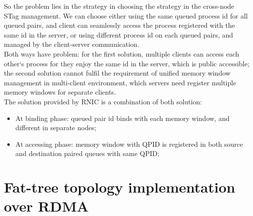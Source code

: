 \documentclass[11pt,openright,a4paper]{report}
\begin{document}
So the problem lies in the strategy in choosing the strategy in the cross-node STag management. We can choose either using the same queued process id for all queued pairs, and client can seamlessly access the process registered with the same id in the server, or using different process id on each queued pairs, and managed by the client-server communication\cite{hilland2010method}.\\
Both ways have problem: for the first solution, multiple clients can access each other`s process for they enjoy the same id in the server, which is public accessible; the second solution cannot fulfil the requirement of unified memory window management in multi-client environment, which servers need register multiple memory windows for separate clients.\\
The solution provided by RNIC is a combination of both solution:
\begin{itemize}
	\item At binding phase: queued pair id binds with each memory window, and different in separate nodes;
    \item At accessing phase: memory window with QPID is registered in both source and destination paired queues with same QPID;
\end{itemize}
\section{Fat-tree topology implementation over RDMA}
\end{document}
